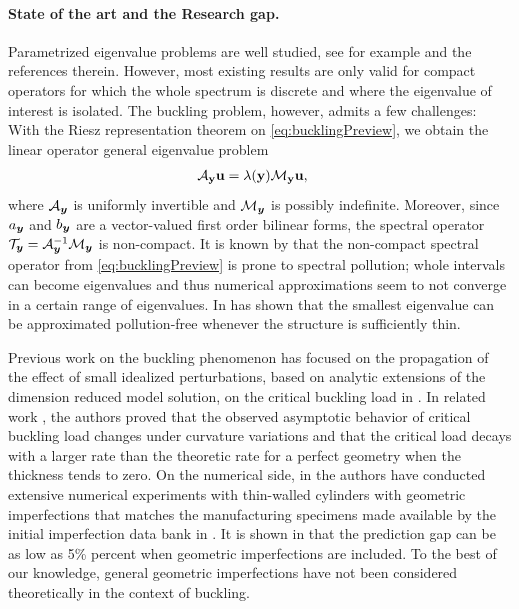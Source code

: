\paragraph{State of the art and the Research gap.}
Parametrized eigenvalue problems are well studied, see for example 
\cite{grubišić2021stochasticcollocationmethodcomputing,chernov2024analyticgevreyclassregularity} 
and the references therein. However, most existing results are only valid for compact operators for which the whole spectrum 
is discrete and where the eigenvalue of interest is isolated. The buckling problem, however, admits a few challenges: 
With the Riesz representation theorem on \eqref{eq:bucklingPreview}, we obtain the linear operator general 
eigenvalue problem
\begin{align*}
    \mathcal{A}_{\mathbf{y}} \mathbf{u} &= \lambda(\mathbf{y})\mathcal{M}_{\mathbf{y}} \mathbf{u},
\end{align*}
where $\mathcal{A}_{\boldsymbol{y}}$ is uniformly invertible and $\mathcal{M}_{\boldsymbol{y}}$ is possibly indefinite.  
Moreover, since $a_{\boldsymbol{y}}$ and $b_{\boldsymbol{y}}$ are a vector-valued first order bilinear forms, 
the spectral operator $\mathcal{T}_{\boldsymbol{y}} = \mathcal{A}_{\boldsymbol{y}}^{-1} \mathcal{M}_{\boldsymbol{y}}$ is non-compact. It is known by 
\cite{DaugeandSuriNumericalapproximation} that the non-compact spectral operator from \eqref{eq:bucklingPreview} 
is prone to spectral pollution; whole intervals can become eigenvalues and thus numerical approximations 
seem to not converge in a certain range of eigenvalues. In \cite{DaugeandSuriNumericalapproximation}
has shown that the smallest eigenvalue can be approximated pollution-free whenever the structure 
is sufficiently thin. 

Previous work on the buckling phenomenon has focused on the propagation of the effect of small idealized perturbations, 
based on analytic extensions of the dimension reduced model solution, on the critical buckling 
load in  \cite{HUTCHINSON2018157}. In related work \cite{Harutyunyan2023}, 
the authors proved that the observed asymptotic 
behavior of critical buckling load changes 
under curvature variations and that the critical load decays 
with a larger rate than the theoretic rate for a perfect geometry 
when the thickness tends to zero. %
On the numerical side, in \cite{SCHENK20073424} the authors have conducted extensive 
numerical experiments with thin-walled cylinders with geometric imperfections that matches the manufacturing specimens
made available by the initial imperfection data bank in \cite{arbocz1979initial}. It is shown in \cite{HILBURGER2004369} 
that the prediction gap can be as low as 5\% percent when geometric imperfections are included.
To the best of our knowledge, general geometric imperfections have not been considered 
theoretically in the context of buckling.

